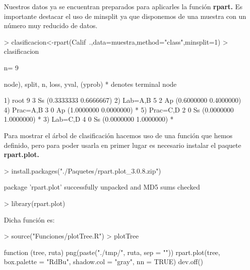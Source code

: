 \documentclass [a4paper] {article}
\begin{document}
\bigskip
Nuestros datos ya se encuentran preparados para aplicarles la función \textbf{rpart.} Es importante destacar
el uso de minsplit ya que disponemos de una muestra con un número muy reducido de datos.
\begin{Schunk}
\begin{Sinput}
> clasificacion<-rpart(Calif~.,data=muestra,method="class",minsplit=1)
> clasificacion
\end{Sinput}
\begin{Soutput}
n= 9 

node), split, n, loss, yval, (yprob)
      * denotes terminal node

1) root 9 3 Ss (0.3333333 0.6666667)  
  2) Lab=A,B 5 2 Ap (0.6000000 0.4000000)  
    4) Prac=A,B 3 0 Ap (1.0000000 0.0000000) *
    5) Prac=C,D 2 0 Ss (0.0000000 1.0000000) *
  3) Lab=C,D 4 0 Ss (0.0000000 1.0000000) *
\end{Soutput}
\end{Schunk}

\bigskip
Para mostrar el árbol de clasificación hacemos uso de una función que hemos definido, pero para poder usarla 
en primer lugar es necesario instalar el paquete \textbf{rpart.plot.}
\begin{Schunk}
\begin{Sinput}
> install.packages("./Paquetes/rpart.plot_3.0.8.zip")
\end{Sinput}
\begin{Soutput}
package 'rpart.plot' successfully unpacked and MD5 sums checked
\end{Soutput}
\begin{Sinput}
> library(rpart.plot)
\end{Sinput}
\end{Schunk}

Dicha función es:
\begin{Schunk}
\begin{Sinput}
> source("Funciones/plotTree.R")
> plotTree
\end{Sinput}
\begin{Soutput}
function (tree, ruta) 
{
    png(paste("./tmp/", ruta, sep = ""))
    rpart.plot(tree, box.palette = "RdBu", shadow.col = "gray", 
        nn = TRUE)
    dev.off()
}
\end{Soutput}
\end{Schunk}
\end{document}
